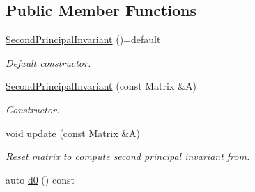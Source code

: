 \subsection*{Public Member Functions}
\begin{DoxyCompactItemize}
\item 
\hypertarget{classRFFGen_1_1LinearAlgebra_1_1SecondPrincipalInvariant_a61eb0b2c86c253d6a5cbb23c3260cf5a}{\hyperlink{classRFFGen_1_1LinearAlgebra_1_1SecondPrincipalInvariant_a61eb0b2c86c253d6a5cbb23c3260cf5a}{Second\-Principal\-Invariant} ()=default}\label{classRFFGen_1_1LinearAlgebra_1_1SecondPrincipalInvariant_a61eb0b2c86c253d6a5cbb23c3260cf5a}

\begin{DoxyCompactList}\small\item\em Default constructor. \end{DoxyCompactList}\item 
\hyperlink{classRFFGen_1_1LinearAlgebra_1_1SecondPrincipalInvariant_ad9aa80cca5fbd2247ecb75e0bfd7775e}{Second\-Principal\-Invariant} (const Matrix \&A)
\begin{DoxyCompactList}\small\item\em Constructor. \end{DoxyCompactList}\item 
\hypertarget{classRFFGen_1_1LinearAlgebra_1_1SecondPrincipalInvariant_a373b805f57413a22f15c472e1967e244}{void \hyperlink{classRFFGen_1_1LinearAlgebra_1_1SecondPrincipalInvariant_a373b805f57413a22f15c472e1967e244}{update} (const Matrix \&A)}\label{classRFFGen_1_1LinearAlgebra_1_1SecondPrincipalInvariant_a373b805f57413a22f15c472e1967e244}

\begin{DoxyCompactList}\small\item\em Reset matrix to compute second principal invariant from. \end{DoxyCompactList}\item 
\hypertarget{classRFFGen_1_1LinearAlgebra_1_1SecondPrincipalInvariant_a73cf245582d0f3bd0a5702b175a78537}{auto \hyperlink{classRFFGen_1_1LinearAlgebra_1_1SecondPrincipalInvariant_a73cf245582d0f3bd0a5702b175a78537}{d0} () const }\label{classRFFGen_1_1LinearAlgebra_1_1SecondPrincipalInvariant_a73cf245582d0f3bd0a5702b175a78537}


\end{DoxyCompactItemize}

